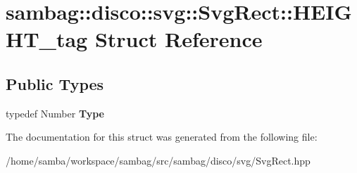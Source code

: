 \hypertarget{structsambag_1_1disco_1_1svg_1_1_svg_rect_1_1_h_e_i_g_h_t__tag}{
\section{sambag::disco::svg::SvgRect::HEIGHT\_\-tag Struct Reference}
\label{structsambag_1_1disco_1_1svg_1_1_svg_rect_1_1_h_e_i_g_h_t__tag}
}
\subsection*{Public Types}
\begin{DoxyCompactItemize}
\item 
\hypertarget{structsambag_1_1disco_1_1svg_1_1_svg_rect_1_1_h_e_i_g_h_t__tag_aa38f3f000fa8985e53d633bb6a3233e0}{
typedef Number {\bfseries Type}}
\label{structsambag_1_1disco_1_1svg_1_1_svg_rect_1_1_h_e_i_g_h_t__tag_aa38f3f000fa8985e53d633bb6a3233e0}

\end{DoxyCompactItemize}


The documentation for this struct was generated from the following file:\begin{DoxyCompactItemize}
\item 
/home/samba/workspace/sambag/src/sambag/disco/svg/SvgRect.hpp\end{DoxyCompactItemize}
